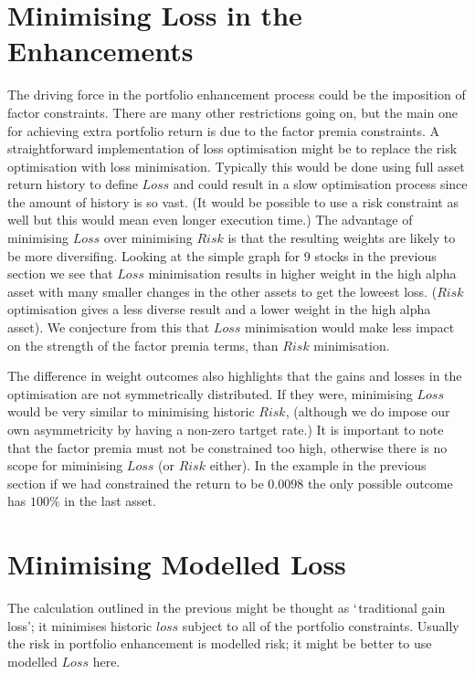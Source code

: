 \documentclass[12pt]{article}
\begin{document}
\section{Minimising Loss in the Enhancements}
The driving force in the portfolio enhancement process could be the imposition
of factor constraints. There are many other restrictions going on, but the main one for 
achieving extra portfolio return is due to the factor premia constraints. A straightforward 
implementation of loss optimisation might be to replace the risk optimisation with loss minimisation.
Typically this would be done using full asset return history to define $Loss$ and could 
result in a slow optimisation process since the amount of history is so vast. (It would be possible 
to use a risk constraint as well but this would mean even longer execution time.) The advantage of
minimising $Loss$ over minimising $Risk$ is that the resulting weights are likely
to be more diversifing. Looking at the simple graph for 9 stocks in the previous section we see that
$Loss$ minimisation results in higher weight in the high alpha asset with many 
smaller changes in the other assets to get the loweest loss. ($Risk$ optimisation gives a less diverse
result and a lower weight in the high alpha asset). We conjecture from this that $Loss$ minimisation 
would make less impact on the strength of the factor premia terms, than $Risk$ minimisation. 

The difference in weight outcomes also
highlights that the gains and losses in the optimisation are not symmetrically
distributed. If they were, minimising $Loss$ would be very similar to minimising historic $Risk$, (although
we do impose our own asymmetricity by having a non-zero tartget rate.) It is important
to note that the factor premia must not be constrained too high, otherwise there is no scope 
for miminising $Loss$ (or $Risk$ either). In the example in the previous section 
if we had constrained the return to be $0.0098$ the only possible outcome has $100\%$ in 
the last asset.
\section{Minimising Modelled Loss}
The calculation outlined in the previous might be thought as $`$traditional gain loss'; it
minimises historic $loss$ subject to all of the portfolio constraints. Usually the risk in 
portfolio enhancement is modelled risk; it might be better to use modelled $Loss$ here.
\end{document}
